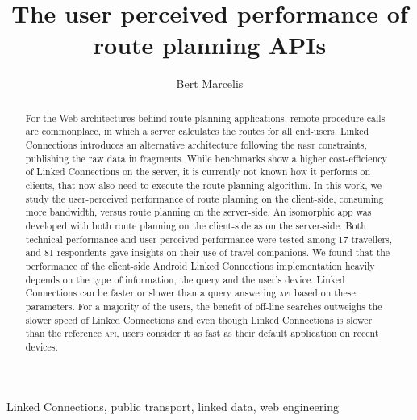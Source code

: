 \documentclass[twocolumn]{phdsymp} %
\begin{document}
\title{The user perceived performance of route planning APIs} %

\author{Bert Marcelis}


\maketitle

\begin{abstract}
For the Web architectures behind route planning applications, remote procedure calls are commonplace, in which a server calculates the routes for all end-users. Linked Connections introduces an alternative architecture following the \textsc{rest} constraints, publishing the raw data in fragments. While benchmarks show a higher cost-efficiency of Linked Connections on the server, it is currently not known how it performs on clients, that now also need to execute the route planning algorithm. In this work, we study the user-perceived performance of route planning on the client-side, consuming more bandwidth, versus route planning on the server-side. An isomorphic app was developed with both route planning on the client-side as on the server-side. Both technical performance and user-perceived performance were tested among 17 travellers, and 81 respondents gave insights on their use of travel companions.
We found that the performance of the client-side Android Linked Connections implementation heavily depends on the type of information, the query and the user’s device. Linked Connections can be faster or slower than a query answering \textsc{api} based on these parameters. For a majority of the users, the benefit of off-line searches outweighs the slower speed of Linked Connections and even though Linked Connections is slower than the reference \textsc{api}, users consider it as fast as their default application on recent devices.


\end{abstract}

\begin{keywords}
Linked Connections, public transport, linked data, web engineering
\end{keywords}
\end{document}
